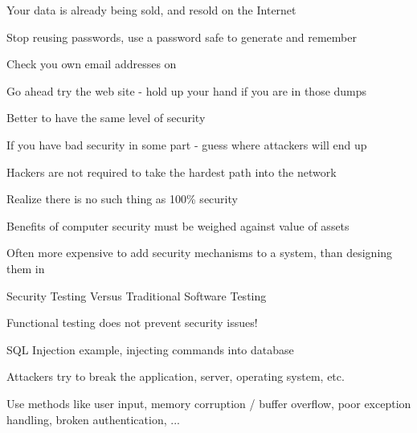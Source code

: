 \documentclass[Screen16to9,17pt]{foils}
\begin{document}


\begin{list1}
\item Your data is already being sold, and resold on the Internet
\item Stop reusing passwords, use a password safe to generate and remember
\item Check you own email addresses on 
\end{list1}

\centerline{Go ahead try the web site - hold up your hand if you are in those dumps}





\begin{list1}
\item Better to have the same level of security
\item If you have bad security in some part - guess where attackers will end up
\item Hackers are not required to take the hardest path into the network
\item Realize there is no such thing as 100\% security
\end{list1}


\begin{list1}
\item Benefits of computer security must be weighed against value of assets
\item Often more expensive to add security mechanisms to a system, than designing them in
\end{list1}






\begin{list2}
\item Security Testing Versus Traditional Software Testing
\item Functional testing does not prevent security issues!
\item SQL Injection example, injecting commands into database
\item Attackers try to break the application, server, operating system, etc.
\item Use methods like user input, memory corruption / buffer overflow, poor exception handling, broken authentication, ...
\end{list2}
\end{document}
